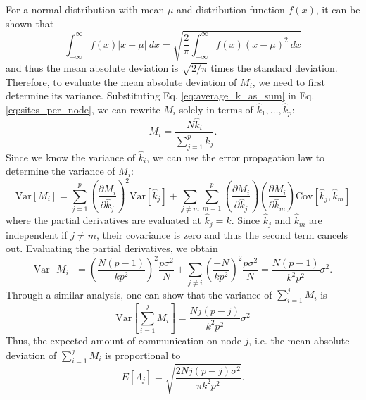 \documentclass[11pt]{article}
\begin{document}
For a normal distribution with mean $\mu$ and distribution function
$f(x)$, it can be shown that
\begin{equation}
  \int_{-\infty}^{\infty} f(x) \left | x - \mu \right | \: dx =
  \sqrt{\frac{2}{\pi} \int_{-\infty}^{\infty} f(x) \left ( x - \mu
    \right )^2 \: dx}
\end{equation}
and thus the mean absolute deviation is $\sqrt{2/\pi}$ times the
standard deviation. Therefore, to evaluate the mean absolute deviation
of $M_i$, we need to first determine its variance. Substituting
Eq. \ref{eq:average_k_as_sum} in Eq. \ref{eq:sites_per_node}, we can
rewrite $M_i$ solely in terms of $\hat{k}_1, \dots, \hat{k}_p$:
\begin{equation}
  M_i = \frac{N \hat{k}_i}{\sum\limits_{j=1}^p \hat{k}_j}.
\end{equation}
Since we know the variance of $\hat{k}_i$, we can use the error
propagation law to determine the variance of $M_i$:
\begin{equation}
  \text{Var} \left [ M_i \right ] = \sum_{j=1}^p \left (
  \frac{\partial M_i}{\partial \hat{k}_j} \right )^2 \text{Var} \left
       [ \hat{k}_j \right ] + \sum\limits_{j \neq m}
       \sum\limits_{m=1}^p \left ( \frac{\partial M_i}{\partial
         \hat{k}_j} \right ) \left ( \frac{\partial M_i}{\partial
         \hat{k}_m} \right ) \text{Cov} \left [ \hat{k}_j, \hat{k}_m
         \right ]
\end{equation}
where the partial derivatives are evaluated at $\hat{k}_j = k$. Since
$\hat{k}_j$ and $\hat{k}_m$ are independent if $j \neq m$, their
covariance is zero and thus the second term cancels out. Evaluating
the partial derivatives, we obtain
\begin{equation}
  \text{Var} \left [ M_i \right ] = \left ( \frac{N(p-1)}{kp^2} \right
  )^2 \frac{p\sigma^2}{N} + \sum_{j \neq i} \left ( \frac{-N}{kp^2}
  \right )^2 \frac{p\sigma^2}{N} = \frac{N(p-1)}{k^2p^2} \sigma^2.
\end{equation}
Through a similar analysis, one can show that the variance of
$\sum_{i=1}^j M_i$ is
\begin{equation}
  \text{Var} \left [ \sum_{i=1}^j M_i \right ] =
  \frac{Nj(p-j)}{k^2p^2} \sigma^2
\end{equation}
Thus, the expected amount of communication on node $j$, i.e. the mean
absolute deviation of $\sum_{i=1}^j M_i$ is proportional to
\begin{equation}\label{eq:comm-cost}
  E \left [ \Lambda_j \right ] = \sqrt{\frac{2Nj(p-j)\sigma^2}{\pi
      k^2p^2}}.
\end{equation}
\end{document}
